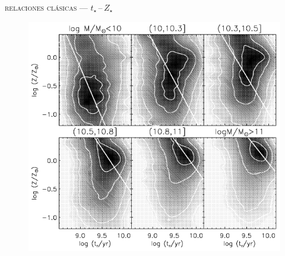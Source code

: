 \documentclass[xcolor=dvipsnames,4pt,hyperref={colorlinks,citecolor=black,linkcolor=black,urlcolor=black}]{beamer}
\begin{document}
\begin{frame}{\textsc{relaciones clásicas --- $t_\star\,$--$\,Z_\star$}}

\begin{figure}
\includegraphics[scale=1]{img/gallazzi2005-11}
\end{figure}
\end{frame}
\end{document}
